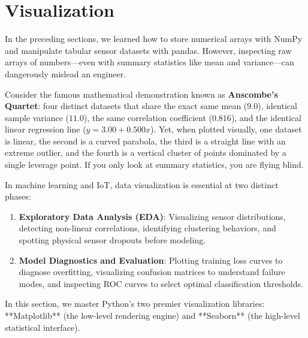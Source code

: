 \section{Visualization}\label{sec:visualization}

In the preceding sections, we learned how to store numerical arrays with NumPy and manipulate tabular sensor datasets with pandas. However, inspecting raw arrays of numbers—even with summary statistics like mean and variance—can dangerously mislead an engineer.

Consider the famous mathematical demonstration known as \textbf{Anscombe's Quartet}: four distinct datasets that share the exact same mean ($9.0$), identical sample variance ($11.0$), the same correlation coefficient ($0.816$), and the identical linear regression line ($y = 3.00 + 0.500x$). Yet, when plotted visually, one dataset is linear, the second is a curved parabola, the third is a straight line with an extreme outlier, and the fourth is a vertical cluster of points dominated by a single leverage point. If you only look at summary statistics, you are flying blind.

In machine learning and IoT, data visualization is essential at two distinct phases:
\begin{enumerate}
    \item \textbf{Exploratory Data Analysis (EDA)}: Visualizing sensor distributions, detecting non-linear correlations, identifying clustering behaviors, and spotting physical sensor dropouts before modeling.
    \item \textbf{Model Diagnostics and Evaluation}: Plotting training loss curves to diagnose overfitting, visualizing confusion matrices to understand failure modes, and inspecting ROC curves to select optimal classification thresholds.
\end{enumerate}

In this section, we master Python's two premier visualization libraries: **Matplotlib** (the low-level rendering engine) and **Seaborn** (the high-level statistical interface).

